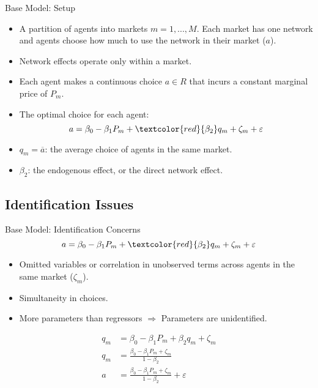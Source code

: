\documentclass[aspectratio=169]{beamer}  %
\begin{document}
\begin{frame}{Base Model: Setup}
    \begin{itemize}
        \item A partition of agents into markets $m = 1,...,M$. Each market has one network and agents choose how much
        to use the network in their market ($a$).
        \item Network effects operate only within a market.
        \item Each agent makes a continuous choice $a \in R$ that incurs a constant marginal price of $P_m$.
        \item The optimal choice for each agent:
        $$ a = \beta_0 - \beta_1P_m + \textcolor{red}{\beta_2}q_m + \zeta_m + \varepsilon $$
        \item $q_m = \overline{a}$: the average choice of agents in the same market.
        \item $\beta_2$: the endogenous effect, or the direct network effect.
    \end{itemize}

\end{frame}

\subsection{Identification Issues}
\begin{frame}{Base Model: Identification Concerns}
    $$ a = \beta_0 - \beta_1P_m + \textcolor{red}{\beta_2}q_m + \zeta_m + \varepsilon $$
    \vspace{-0.3cm}
    \begin{itemize}
        \item Omitted variables or correlation in unobserved terms across agents in the same market ($\zeta_m$).
        \item Simultaneity in choices.
        \item More parameters than regressors $\Rightarrow$ Parameters are unidentified.
    \end{itemize}
    \begin{align*}
        q_m &= \beta_0 - \beta_1P_m + \beta_2q_m + \zeta_m \\[5pt]
        q_m &= \frac{\beta_0-\beta_1P_m+\zeta_m}{1-\beta_2} \\[5pt]
        a &= \frac{\beta_0-\beta_1P_m+\zeta_m}{1-\beta_2} + \varepsilon
    \end{align*}
\end{frame}
\end{document}
